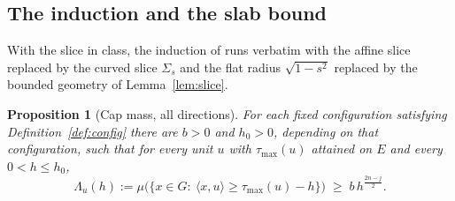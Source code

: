 \documentclass[11pt]{article}
\newtheorem{proposition}[theorem]{Proposition}
\begin{document}
\subsection{The induction and the slab bound}\label{ss:induction}

With the slice in class, the induction of \cite[\S4, Case 2]{companion11} runs
verbatim with the affine slice replaced by the curved slice $\Sigma_s$ and the
flat radius $\sqrt{1-s^2}$ replaced by the bounded geometry of
Lemma~\ref{lem:slice}.

\begin{proposition}[Cap mass, all directions]\label{prop:allcap}
For each fixed configuration satisfying Definition~\ref{def:config} there are
$b>0$ and $h_0>0$, depending on that configuration, such that for every unit $u$ with
$\tau_{\max}(u)$ attained on $E$ and every $0<h\le h_0$,
\[
\Lambda_u(h):=\mu\bigl(\{x\in G:\ \langle x,u\rangle\ge\tau_{\max}(u)-h\}\bigr)
\;\ge\;b\,h^{\frac{2n-j}2}.
\]
\end{proposition}
\end{document}
